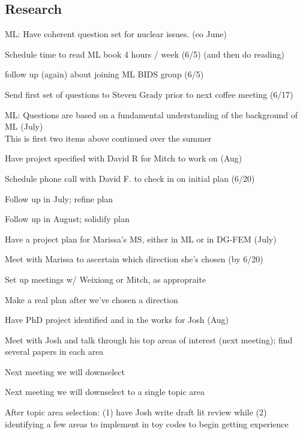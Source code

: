 \documentclass[12pt,twoside]{article}
\begin{document}
\subsection{Research}
\begin{compactitem}
\item ML: Have coherent question set for nuclear issues. (eo June)
  \begin{compactitem}
  \item Schedule time to read ML book 4 hours / week (6/5) (and then do reading)
  \item follow up (again) about joining ML BIDS group (6/5)
  \item Send first set of questions to Steven Grady prior to next coffee meeting (6/17)
  \end{compactitem}  

\item ML: Questions are based on a fundamental understanding of the background of ML (July)\\
\hspace*{2em} This is first two items above continued over the summer

\item Have project specified with David R for Mitch to work on (Aug)
  \begin{compactitem}
  \item Schedule phone call with David F. to check in on initial plan (6/20)
  \item Follow up in July; refine plan
  \item Follow up in August; solidify plan
  \end{compactitem}
  
\item Have a project plan for Marissa's MS, either in ML or in DG-FEM (July)
  \begin{compactitem}
  \item Meet with Marissa to ascertain which direction she's chosen (by 6/20)
  \item Set up meetings w/ Weixiong or Mitch, as appropraite
  \item Make a real plan after we've chosen a direction
  \end{compactitem}

\item Have PhD project identified and in the works for Josh (Aug)
  \begin{compactitem}
  \item Meet with Josh and talk through his top areas of interest (next meeting); find several papers in each area
  \item Next meeting we will downselect
  \item Next meeting we will downselect to a single topic area
  \item After topic area selection: (1) have Josh write draft lit review while (2) identifying a few areas to implement in toy codes to begin getting experience
  \end{compactitem}


\end{compactitem}
\end{document}
